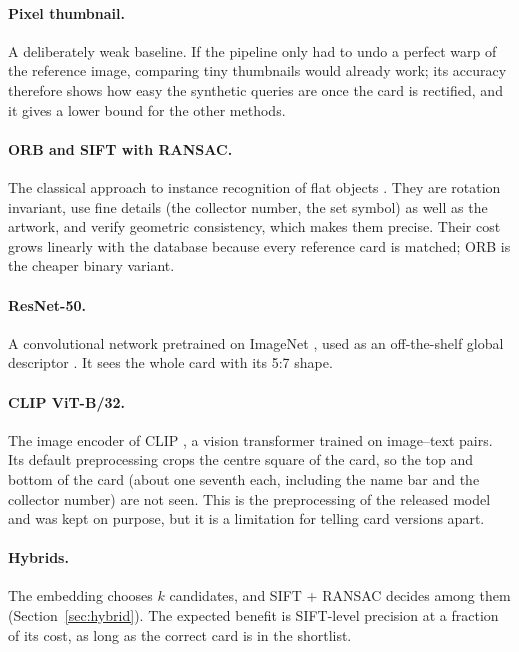 \paragraph{Pixel thumbnail.} A deliberately weak baseline. If the pipeline only had to undo a perfect warp of the reference image, comparing tiny thumbnails would already work; its accuracy therefore shows how easy the synthetic queries are once the card is rectified, and it gives a lower bound for the other methods.

\paragraph{ORB and SIFT with RANSAC.} The classical approach to instance recognition of flat objects \citep{lowe2004sift, rublee2011orb, fischler1981ransac}. They are rotation invariant, use fine details (the collector number, the set symbol) as well as the artwork, and verify geometric consistency, which makes them precise. Their cost grows linearly with the database because every reference card is matched; ORB is the cheaper binary variant.

\paragraph{ResNet-50.} A convolutional network pretrained on ImageNet \citep{he2016resnet, deng2009imagenet}, used as an off-the-shelf global descriptor \citep{razavian2014cnnfeatures, babenko2014neuralcodes}. It sees the whole card with its 5:7 shape.

\paragraph{CLIP ViT-B/32.} The image encoder of CLIP \citep{radford2021clip}, a vision transformer \citep{dosovitskiy2021vit} trained on image--text pairs. Its default preprocessing crops the centre square of the card, so the top and bottom of the card (about one seventh each, including the name bar and the collector number) are not seen. This is the preprocessing of the released model and was kept on purpose, but it is a limitation for telling card versions apart.

\paragraph{Hybrids.} The embedding chooses $k$ candidates, and SIFT + RANSAC decides among them (Section~\ref{sec:hybrid}). The expected benefit is SIFT-level precision at a fraction of its cost, as long as the correct card is in the shortlist.

